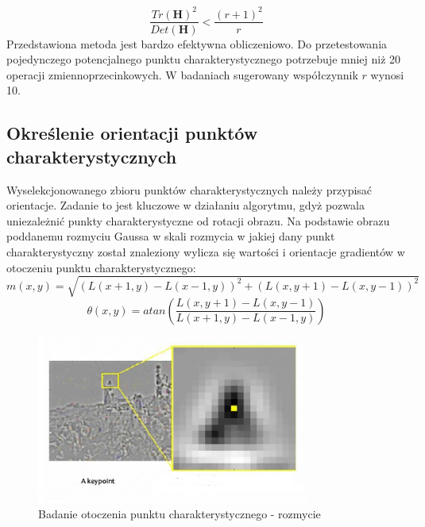 \begin{equation}
\frac{Tr(\textbf{H})^2}{Det(\textbf{H})} < \frac{(r+1)^2}{r} 
\label{eqn:ratio_prog}
\end{equation}
Przedstawiona metoda jest bardzo efektywna obliczeniowo. Do przetestowania pojedynczego potencjalnego punktu charakterystycznego potrzebuje mniej niż 20 operacji zmiennoprzecinkowych. W badaniach \cite{DGL04} sugerowany współczynnik $r$ wynosi 10.


\subsection{Określenie orientacji punktów charakterystycznych}
Wyselekcjonowanego zbioru  punktów charakterystycznych należy przypisać orientacje. Zadanie to jest kluczowe w działaniu algorytmu, gdyż pozwala uniezależnić punkty charakterystyczne od rotacji obrazu. Na podstawie obrazu poddanemu rozmyciu Gaussa w skali rozmycia w jakiej dany punkt charakterystyczny został znaleziony wylicza się wartości i orientacje gradientów w otoczeniu punktu charakterystycznego:
\begin{equation}
m(x,y) = \sqrt{(L(x+1,y)-L(x-1,y))^2+(L(x,y+1)-L(x,y-1))^2}
\end{equation}
\begin{equation}
\theta(x,y) = atan(\frac{L(x,y+1)-L(x,y-1)}{L(x+1,y)-L(x-1,y)})
\end{equation}
\begin{figure}[!htb]
\centering
\includegraphics[width=0.8\textwidth]{pict/02/sift/sift_ais_orientation_1.jpg}
\caption{Badanie otoczenia punktu charakterystycznego - rozmycie}
\label{fig:sift_ais_orientation_1}
\end{figure}
